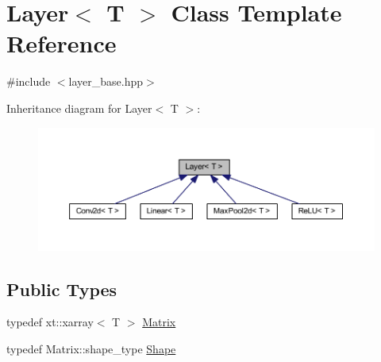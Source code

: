 \hypertarget{class_layer}{}\section{Layer$<$ T $>$ Class Template Reference}
\label{class_layer}


{\ttfamily \#include $<$layer\+\_\+base.\+hpp$>$}



Inheritance diagram for Layer$<$ T $>$\+:\nopagebreak
\begin{figure}[H]
\begin{center}
\leavevmode
\includegraphics[width=350pt]{class_layer__inherit__graph}
\end{center}
\end{figure}
\subsection*{Public Types}
\begin{DoxyCompactItemize}
\item 
typedef xt\+::xarray$<$ T $>$ \mbox{\hyperlink{class_layer_a22b1e7286096aa62bd245536c8ebdaf1}{Matrix}}
\item 
typedef Matrix\+::shape\+\_\+type \mbox{\hyperlink{class_layer_a8313f42d2292d12dd5d40cc115636693}{Shape}}
\end{DoxyCompactItemize}
